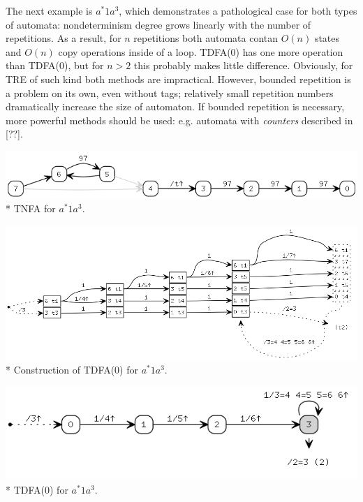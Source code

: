 \documentclass{article}
\theoremstyle{definition}
\begin{document}
\begin{multicols}{2}
The next example is $a^* 1 a^{3}$,
which demonstrates a pathological case for both types of automata:
nondeterminism degree grows linearly with the number of repetitions.
As a result, for $n$ repetitions both automata contan $O(n)$ states and $O(n)$ copy operations inside of a loop.
TDFA(0) has one more operation than TDFA(0), but for $n \!>\! 2$ this probably makes little difference.
Obviously, for TRE of such kind both methods are impractical.
However, bounded repetition is a problem on its own, even without tags;
relatively small repetition numbers dramatically increase the size of automaton.
If bounded repetition is necessary, more powerful methods should be used:
e.g. automata with \emph{counters} described in [??].
\begin{center}
\includegraphics[width=\linewidth]{img/example3/tnfa.png}\\*
\footnotesize{TNFA for $a^* 1 a^{3}$.} \\
\end{center}
\begin{center}
\includegraphics[width=\linewidth]{img/example3/tdfa0_raw.png}\\*
\footnotesize{Construction of TDFA(0) for $a^* 1 a^{3}$.} \\
\end{center}
\begin{center}
\includegraphics[width=0.8\linewidth]{img/example3/tdfa0.png}\\*
\footnotesize{TDFA(0) for $a^* 1 a^{3}$.} \\

\end{center}
\end{multicols}
\end{document}

